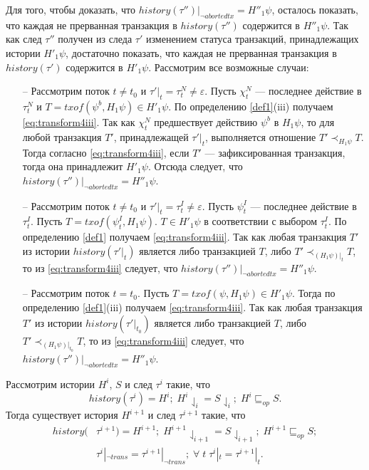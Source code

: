 \begin{myproof}
Для того, чтобы доказать, что $history(\tau'')|_{\neg abortedtx} = H''_1\psi$, осталось показать, что каждая не прерванная транзакция в $history(\tau'')$ содержится в $H''_1\psi$. Так как след $\tau''$ получен из следа $\tau'$ изменением статуса транзакций, принадлежащих истории $H'_1\psi$, достаточно показать, что каждая не прерванная транзакция в $history(\tau')$ содержится в $H'_1\psi$. Рассмотрим все возможные случаи:
\begin{itemize}
\item[--] Рассмотрим поток $t \neq t_0$ и $\tau'|_t = \tau^N_t \neq \varepsilon$. Пусть $\chi^N_t$ --- последнее действие в $\tau^N_t$ и $T = txof(\psi^b, H_1\psi) \in H'_1\psi$. По определению \ref{def1}(iii) %
получаем \eqref{eq:transform4iii}. Так как $\chi^N_t$ предшествует действию $\psi^b$ в $H_1\psi$, то для любой транзакция $T'$, принадлежащей $\tau'|_t$, выполняется отношение $T' \prec_{H_1\psi} T$. Тогда согласно \eqref{eq:transform4iii}, если $T'$ --- зафиксированная транзакция, тогда она принадлежит $H'_1\psi$. Отсюда следует, что $history(\tau'')|_{\neg abortedtx} = H''_1\psi$.
\item[--] Рассмотрим поток $t \neq t_0$ и $\tau'|_t = \tau^I_t \neq \varepsilon$. Пусть $\psi^I_t$ --- последнее действие в $\tau^I_t$. Пусть $T = txof(\psi^I_t, H_1\psi)$. $T \in H'_1\psi$ в соответствии с выбором $\tau^I_t$. По определению \ref{def1} %
получаем \eqref{eq:transform4iii}. Так как любая транзакция $T'$ из истории $history(\tau'|_t)$ является либо транзакцией $T$, либо $T' \prec_{(H_1\psi)|_t} T$, то из \eqref{eq:transform4iii} следует, что $history(\tau'')|_{\neg abortedtx} = H''_1\psi$.
\item[--] Рассмотрим поток $t = t_0$. Пусть $T = txof(\psi, H_1\psi) \in H'_1\psi$. Тогда по определению \ref{def1}(iii) %
получаем \eqref{eq:transform4iii}. Так как любая транзакция $T'$ из истории $history(\tau'|_{t_0})$ является либо транзакцией $T$, либо $T' \prec_{(H_1\psi)|_{t_0}} T$, то из \eqref{eq:transform4iii} следует, что $history(\tau'')|_{\neg abortedtx} = H''_1\psi$.
\end{itemize}
\end{myproof}
\begin{lemma}\label{sufficiency2}
Рассмотрим истории $H^i$, $S$ и след $\tau^i$ такие, что $$history(\tau^i) = H^i; \; H^i\downharpoonleft_i = S \downharpoonleft_i; \; H^i \sqsubseteq_{op} S.$$ Тогда существует история $H^{i+1}$ и след $\tau^{i+1}$ такие, что 
\begin{align*}
history(&\tau^{i+1}) = H^{i+1}; \; H^{i+1}\downharpoonleft_{i+1} = S \downharpoonleft_{i+1}; \; H^{i+1} \sqsubseteq_{op} S; \\
&\tau^{i}|_{\neg trans} = \tau^{i+1}|_{\neg trans}; \; \forall \; t \; \tau^{i}|_t = \tau^{i+1}|_t.
\end{align*} \end{lemma}
